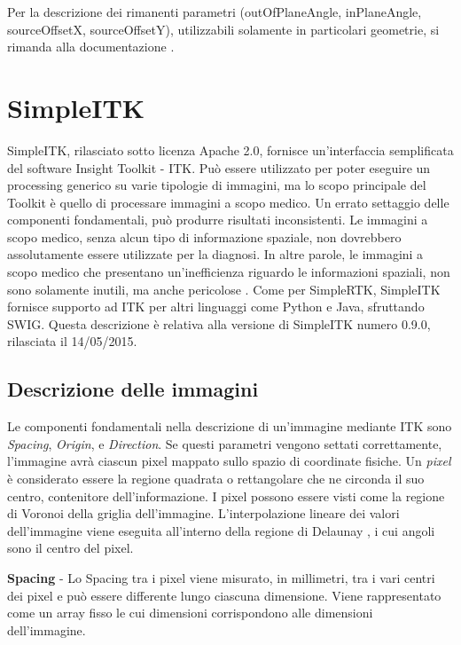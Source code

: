 \documentclass[a4paper,12pt, doubleside]{report}
\begin{document}
                    Per la descrizione dei rimanenti parametri (outOfPlaneAngle, inPlaneAngle, sourceOffsetX, sourceOffsetY), utilizzabili solamente in particolari geometrie, si rimanda alla documentazione \cite{rtk-geometry}.
                
        \section{SimpleITK}
            \par
                SimpleITK, rilasciato sotto licenza Apache 2.0, fornisce un'interfaccia semplificata del software Insight Toolkit - ITK. Può essere utilizzato per poter eseguire un processing generico su varie tipologie di immagini, ma lo scopo principale del Toolkit è quello di processare immagini a scopo medico. Un errato settaggio delle componenti fondamentali, può produrre risultati inconsistenti. Le immagini a scopo medico, senza alcun tipo di informazione spaziale, non dovrebbero assolutamente essere utilizzate per la diagnosi. In altre parole, le immagini a scopo medico che presentano un'inefficienza riguardo le informazioni spaziali, non sono solamente inutili, ma anche pericolose \cite{itk-doc}. Come per SimpleRTK, SimpleITK fornisce supporto ad ITK per altri linguaggi come Python e Java, sfruttando SWIG. Questa descrizione è relativa alla versione di SimpleITK numero 0.9.0, rilasciata il 14/05/2015.
                
            \subsection{Descrizione delle immagini}
                Le componenti fondamentali nella descrizione di un'immagine mediante ITK sono \textit{Spacing}, \textit{Origin}, e \textit{Direction}. Se questi parametri vengono settati correttamente, l'immagine avrà ciascun pixel mappato sullo spazio di coordinate fisiche. Un \textit{pixel} è considerato essere la regione quadrata o rettangolare che ne circonda il suo centro, contenitore dell'informazione. I pixel possono essere visti come la regione di Voronoi \cite{voronoi} della griglia dell’immagine. L’interpolazione lineare dei valori dell’immagine viene eseguita all’interno della regione di Delaunay \cite{delaunay}, i cui angoli sono il centro del pixel.
                
                \bigskip
                \textbf{Spacing} - Lo Spacing tra i pixel viene misurato, in millimetri, tra i vari centri dei pixel e può essere differente lungo ciascuna dimensione. Viene rappresentato come un array fisso le cui dimensioni corrispondono alle dimensioni dell'immagine.
                
\end{document}
